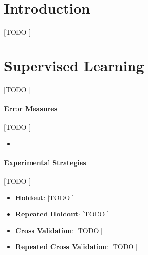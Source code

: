 \documentclass{article}
\begin{document}
	\maketitle %

	\thispagestyle{fancy} %



	\begin{abstract}
		\noindent [TODO ].
	\end{abstract}



	\section{Introduction}
	\label{sec:intro}

			\paragraph{}
			[TODO ]


	\section{Supervised Learning}
	\label{sec:supervised-learning}

		\paragraph{}
		[TODO ]

		\paragraph{Error Measures}
		\label{paragraph:error-measures}
		[TODO ]

		\begin{itemize}
			\item [TODO ]
		\end{itemize}

		\paragraph{Experimental Strategies}
		\label{paragraph:experimental-strategies}
  	[TODO ]

		\begin{itemize}
			\item
				\textbf{Holdout}:
				[TODO ]

			\item
				\textbf{Repeated Holdout}:
				[TODO ]

			\item
				\textbf{Cross Validation}:
				[TODO ]

			\item
				\textbf{Repeated Cross Validation}:
				[TODO ]

		\end{itemize}
\end{document}
